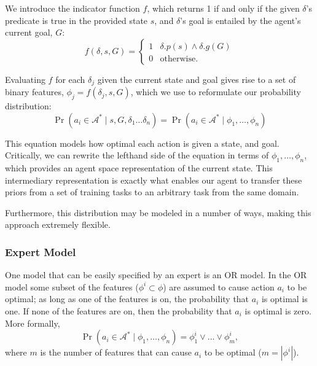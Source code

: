 \documentclass[11pt]{article}
\begin{document}
We introduce the indicator function $f$, which returns 1 if and only if the given $\delta$'s predicate is true in the provided state $s$, and $\delta$'s goal is entailed by the agent's current goal, $G$:
\begin{equation}
f(\delta, s, G) = 
\begin{cases}
1& \delta.p(s) \wedge \delta.g(G) \\
0& \text{otherwise.}
\end{cases}
\label{eq:f_func_def}
\end{equation}

Evaluating $f$ for each $\delta_j$ given the current state and goal gives rise to a set of binary features,
$\phi_j = f(\delta_j, s, G)$, which we use to reformulate our probability distribution:
\begin{equation}
\Pr(a_i \in \mathcal{A}^*  \mid s, G, \delta_1 \ldots \delta_n) = \Pr(a_i \in \mathcal{A}^*  \mid \phi_1, \ldots, \phi_n)
\label{eq:feature_rep}
\end{equation}

This equation models how optimal each action is given a state, and goal. Critically, we can rewrite the lefthand side of the equation in terms of $\phi_1, \ldots, \phi_n$, which provides an agent space representation of the current state. This intermediary representation is exactly what enables our agent to transfer these priors from a set of training tasks to an arbitrary task from the same domain.

Furthermore, this distribution may be modeled in a number of ways, making this approach extremely flexible.

\subsubsection{Expert Model} One model that can be easily specified by
an expert is an OR model.
In the OR model some subset of the features 
($\phi^i \subset \phi$) are
assumed to cause action $a_i$ to be optimal; as long as one of
the features is on, the probability that $a_i$ is optimal is one.
If none of the features are on, then the probability that $a_i$ is 
optimal is zero. More formally,
\begin{equation}
\Pr(a_i \in \mathcal{A}^*  \mid \phi_1, \ldots, \phi_n) = \phi_1^i \lor ... \lor \phi_m^i,
\end{equation}
where $m$ is the number of features that can cause $a_i$ to be optimal ($m = |\phi^i|$).
\end{document}
